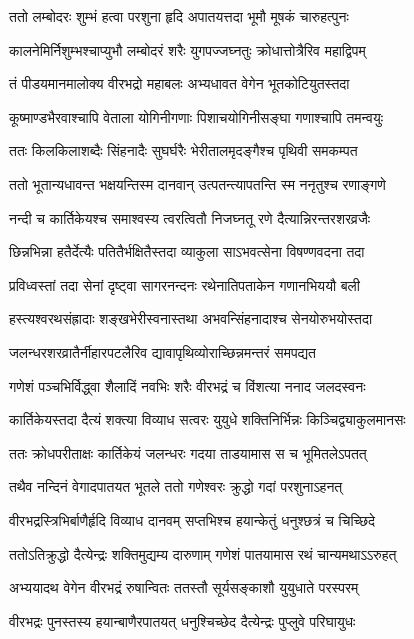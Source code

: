\twolineshloka
{ततो लम्बोदरः शुम्भं हत्वा परशुना हृदि}
{अपातयत्तदा भूमौ मूषकं चारुहत्पुनः} %

\twolineshloka
{कालनेमिर्निशुम्भश्चाप्युभौ लम्बोदरं शरैः}
{युगपज्जघ्नतुः क्रोधात्तोत्रैरिव महाद्विपम्} %

\twolineshloka
{तं पीडयमानमालोक्य वीरभद्रो महाबलः}
{अभ्यधावत वेगेन भूतकोटियुतस्तदा} %

\twolineshloka
{कूष्माण्डभैरवाश्चापि वेताला योगिनीगणाः}
{पिशाचयोगिनीसङ्घा गणाश्चापि तमन्वयुः} %

\twolineshloka
{ततः किलकिलाशब्दैः सिंहनादैः सुघर्घरैः}
{भेरीतालमृदङ्गैश्च पृथिवी समकम्पत} %

\twolineshloka
{ततो भूतान्यधावन्त भक्षयन्तिस्म दानवान्}
{उत्पतन्त्यापतन्ति स्म ननृतुश्च रणाङ्गणे} %

\twolineshloka
{नन्दी च कार्तिकेयश्च समाश्वस्य त्वरत्वितौ}
{निजघ्नतू रणे दैत्यान्निरन्तरशरव्रजैः} %

\twolineshloka
{छिन्नभिन्ना हतैर्देत्यैः पतितैर्भक्षितैस्तदा}
{व्याकुला साऽभवत्सेना विषण्णवदना तदा} %

\twolineshloka
{प्रविध्वस्तां तदा सेनां दृष्ट्वा सागरनन्दनः}
{रथेनातिपताकेन गणानभिययौ बली} %

\twolineshloka
{हस्त्यश्वरथसंह्रादाः शङ्खभेरीस्वनास्तथा}
{अभवन्सिंहनादाश्च सेनयोरुभयोस्तदा} %

\twolineshloka
{जलन्धरशरव्रातैर्नीहारपटलैरिव}
{द्यावापृथिव्योराच्छिन्नमन्तरं समपद्यत} %

\twolineshloka
{गणेशं पञ्चभिर्विद्ध्वा शैलादिं नवभिः शरैः}
{वीरभद्रं च विंशत्या ननाद जलदस्वनः} %

\twolineshloka
{कार्तिकेयस्तदा दैत्यं शक्त्या विव्याध सत्वरः}
{युयुधे शक्तिनिर्भिन्नः किञ्चिद्व्याकुलमानसः} %

\twolineshloka
{ततः क्रोधपरीताक्षः कार्तिकेयं जलन्धरः}
{गदया ताडयामास स च भूमितलेऽपतत्} %

\twolineshloka
{तथैव नन्दिनं वेगादपातयत भूतले}
{ततो गणेश्वरः क्रुद्धो गदां परशुनाऽहनत्} %

\twolineshloka
{वीरभद्रस्त्रिभिर्बाणैर्हृदि विव्याध दानवम्}
{सप्तभिश्च हयान्केतुं धनुश्छत्रं च चिच्छिदे} %

\twolineshloka
{ततोऽतिक्रुद्धो दैत्येन्द्रः शक्तिमुद्यम्य दारुणाम्}
{गणेशं पातयामास रथं चान्यमथाऽऽरुहत्} %

\twolineshloka
{अभ्ययादथ वेगेन वीरभद्रं रुषान्वितः}
{ततस्तौ सूर्यसङ्काशौ युयुधाते परस्परम्} %

\twolineshloka
{वीरभद्रः पुनस्तस्य हयान्बाणैरपातयत्}
{धनुश्चिच्छेद दैत्येन्द्रः पुप्लुवे परिघायुधः} %

